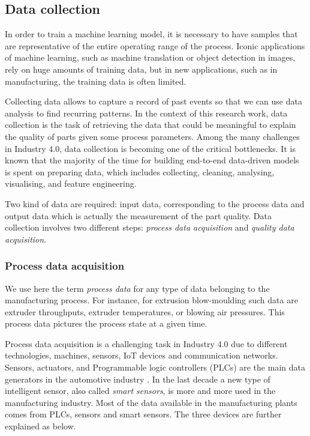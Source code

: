 \subsection{Data collection} \label{Data Collection}

In order to train a machine learning model, it is necessary to have samples that are representative of the entire operating range of the process. Iconic applications of machine learning, such as machine translation or object detection in images, rely on huge amounts of training data, but in new applications, such as in manufacturing, the training data is often limited.

Collecting data allows to capture a record of past events so that we can use data analysis to find recurring patterns. In the context of this research work, data collection is the task of retrieving the data that could be meaningful to explain the quality of parts given some process parameters. Among the many challenges in Industry 4.0, data collection is becoming one of the critical bottlenecks. It is known that the majority of the time for building end-to-end data-driven models is spent on preparing data, which includes collecting, cleaning, analysing, visualising, and feature engineering. 

Two kind of data are required: input data, corresponding to the process data and output data which is actually the measurement of the part quality. Data collection involves two different steps: \textit{process data acquisition} and \textit{quality data acquisition}. 

\subsubsection{Process data acquisition} \label{Process Data Acquisition}

We use here the term \textit{process data} for any type of data belonging to the manufacturing process. For instance, for extrusion blow-moulding such data are extruder throughputs, extruder temperatures, or blowing air pressures. This process data pictures the process state at a given time.

Process data acquisition is a challenging task in Industry 4.0 due to different technologies, machines, sensors, IoT devices and communication networks. Sensors, actuators, and Programmable logic controllers (PLCs) are the main data generators in the automotive industry \citep{khan2017big}. In the last decade a new type of intelligent sensor, also called \textit{smart sensors}, is more and more used in the manufacturing industry. Most of the data available in the manufacturing plants comes from PLCs, sensors and smart sensors. The three devices are further explained as below.

